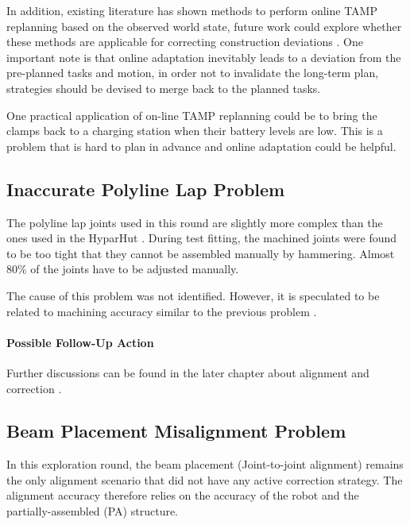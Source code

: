 In addition, existing literature has shown methods to perform online TAMP replanning based on the observed world state, future work could explore whether these methods are applicable for correcting construction deviations \parencite{elbanhawiSamplingBasedRobotMotion2014, otteMathrmRRTRealTime2015}. One important note is that online adaptation inevitably leads to a deviation from the pre-planned tasks and motion, in order not to invalidate the long-term plan, strategies should be devised to merge back to the planned tasks.

One practical application of on-line TAMP replanning could be to bring the clamps back to a charging station when their battery levels are low. This is a problem that is hard to plan in advance and online adaptation could be helpful. 

\subsection{Inaccurate Polyline Lap Problem}
\label{subsection:exploration-5-inaccurate-polyline-lap-problem}

The polyline lap joints used in this round are slightly more complex than the ones used in the HyparHut . During test fitting, the machined joints were found to be too tight that they cannot be assembled manually by hammering. Almost 80\% of the joints have to be adjusted manually. 

The cause of this problem was not identified. However, it is speculated to be related to machining accuracy similar to the previous problem .

\paragraph{Possible Follow-Up Action}

Further discussions can be found in the later chapter about alignment and correction .

\subsection{Beam Placement Misalignment Problem}
\label{subsection:exploration-5-beam-placement-misalignment-problem}

In this exploration round, the beam placement (Joint-to-joint alignment) remains the only alignment scenario that did not have any active correction strategy. The alignment accuracy therefore relies on the accuracy of the robot and the partially-assembled (PA) structure. 

